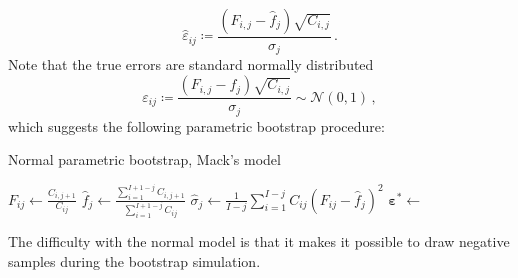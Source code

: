 \documentclass[a4paper]{book}
\theoremstyle{plain}
\begin{document}
\begin{equation}
\hat{\varepsilon}_{ij} \coloneqq \frac{(F_{i, j} - \hat{f}_j)\sqrt{C_{i, j}}}{\sigma_j} \,.
\end{equation}
Note that the true errors are standard normally distributed
\begin{equation}
    \varepsilon_{ij} \coloneqq \frac{(F_{i, j} - f_j)\sqrt{C_{i, j}}}{\sigma_j} \sim \mathcal{N}(0, 1) \,,
\end{equation}
which suggests the following parametric bootstrap procedure:
\begin{algorithm}
    \caption{Normal parametric bootstrap, Mack's model}
    \label{alg:mackparamnorm}
    \begin{algorithmic}
        
        \State 
    \end{algorithmic}
\end{algorithm}

        \vspace{2pt}
        \vspace{2pt}

\begin{algorithm}
    \begin{algorithmic}
            \vspace{3pt}
            \State $\displaystyle F_{ij} \gets \frac{C_{i, j+1}}{C_{ij}}$
            \vspace{4pt}
            \State $\displaystyle \hat{f}_j \gets \frac{\sum_{i=1}^{I+1-j}C_{i, j + 1}}{\sum_{i=1}^{I+1-j}C_{ij}}$
            \vspace{4pt}
            \State $\displaystyle \hat{\sigma}_j \gets \frac{1}{I-j}\sum_{i=1}^{I-j} C_{ij}\left( F_{ij} - \hat{f}_j \right)^2$
            \vspace{3pt}
        \EndFor
        \State $\bm{\varepsilon^*} \gets$ 
    \end{algorithmic}
\end{algorithm}


The difficulty with the normal model is that it makes it possible to draw negative samples during the bootstrap simulation. 
\end{document}
